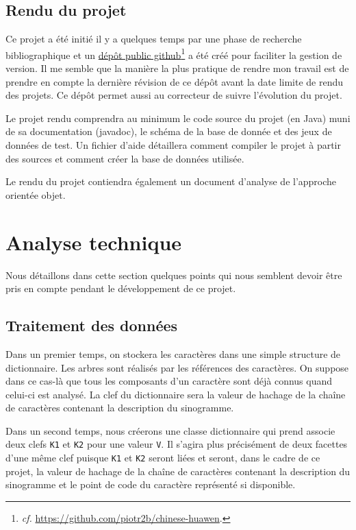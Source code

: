 \documentclass[12pt,oneside]{article}
\begin{document}
\subsection{Rendu du projet}

Ce projet a été initié il y a quelques temps par une phase de recherche bibliographique et un \href{https://github.com/piotr2b/chinese-huawen}{dépôt public github}\footnote{\textsl{cf.} \url{https://github.com/piotr2b/chinese-huawen}.} a été créé pour faciliter la gestion de version. Il me semble que la manière la plus pratique de rendre mon travail est de prendre en compte la dernière révision de ce dépôt avant la date limite de rendu des projets. Ce dépôt permet aussi au correcteur de suivre l'évolution du projet.

Le projet rendu comprendra au minimum le code source du projet (en Java) muni de sa documentation (javadoc), le schéma de la base de donnée et des jeux de données de test. Un fichier d'aide détaillera comment compiler le projet à partir des sources et comment créer la base de données utilisée.

Le rendu du projet contiendra également un document d'analyse de l'approche orientée objet.

\section{Analyse technique}

Nous détaillons dans cette section quelques points qui nous semblent devoir être pris en compte pendant le développement de ce projet.

\subsection{Traitement des données}

Dans un premier temps, on stockera les caractères dans une simple structure de dictionnaire. Les arbres sont réalisés par les références des caractères. On suppose dans ce cas-là que tous les composants d'un caractère sont déjà connus quand celui-ci est analysé. La clef du dictionnaire sera la valeur de hachage de la chaîne de caractères contenant la description du sinogramme.

Dans un second temps, nous créerons une classe dictionnaire qui prend associe deux clefs \texttt{K1} et \texttt{K2} pour une valeur \texttt{V}. Il s'agira plus précisément de deux facettes d'une même clef puisque \texttt{K1} et \texttt{K2} seront liées et seront, dans le cadre de ce projet, la valeur de hachage de la chaîne de caractères contenant la description du sinogramme et le point de code du caractère représenté si disponible.
\end{document}
